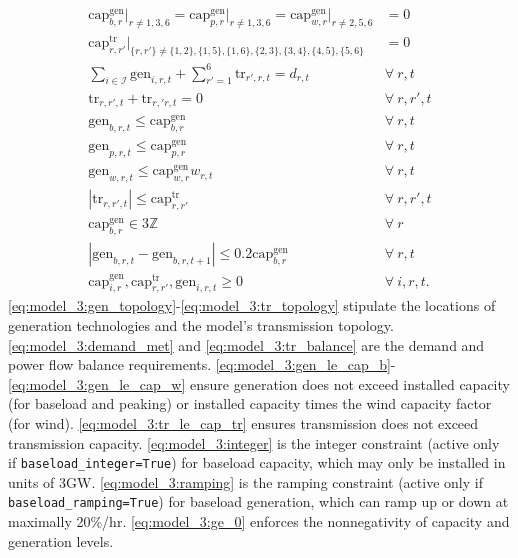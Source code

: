 \documentclass[preprint]{elsarticle}
\begin{document}
\begin{align}
\text{cap}_{b,r}^\text{gen} \big\rvert_{r \ne 1, 3, 6} = \text{cap}_{p,r}^\text{gen} \big\rvert_{r \ne 1, 3, 6} = \text{cap}_{w,r}^\text{gen} \big\rvert_{r \ne 2, 5, 6} &= 0 \label{eq:model_3:gen_topology} \\
\text{cap}_{r, r'}^\text{tr} \big\rvert_{\{r, r'\} \ne \{1,2\}, \{1,5\}, \{1,6\}, \{2,3\}, \{3,4\}, \{4,5\}, \{5,6\}} &= 0 \label{eq:model_3:tr_topology} \\
\sum_{i \in \mathcal{I}} \text{gen}_{i,r,t} + \sum_{r'=1}^6 \text{tr}_{r',r,t} = d_{r,t} \quad & \forall \: r, t \label{eq:model_3:demand_met} \\
\text{tr}_{r,r',t} + \text{tr}_{r,'r,t} = 0 \quad & \forall \: r, r', t \label{eq:model_3:tr_balance} \\
\text{gen}_{b,r,t} \le \text{cap}_{b,r}^\text{gen} \quad & \forall \: r, t \label{eq:model_3:gen_le_cap_b} \\
\text{gen}_{p,r,t} \le \text{cap}_{p,r}^\text{gen} \quad & \forall \: r, t \label{eq:model_3:gen_le_cap_p} \\
\text{gen}_{w,r,t} \le \text{cap}_{w,r}^\text{gen} w_{r,t} \quad & \forall \: r, t \label{eq:model_3:gen_le_cap_w} \\
|\text{tr}_{r,r',t}| \le \text{cap}_{r,r'}^\text{tr} \quad & \forall \: r, r', t \label{eq:model_3:tr_le_cap_tr} \\
\text{cap}_{b,r}^\text{gen} \in 3\mathbb{Z} \quad & \forall \: r \label{eq:model_3:integer} \\
|\text{gen}_{b,r,t} - \text{gen}_{b,r,t+1}| \le 0.2 \text{cap}_{b,r}^\text{gen} \quad & \forall \: r, t \label{eq:model_3:ramping} \\
\text{cap}_{i,r}^\text{gen}, \text{cap}_{r,r'}^\text{tr}, \text{gen}_{i,r,t} \ge 0 \quad & \forall \: i, r, t. \label{eq:model_3:ge_0}
\end{align}
\noindent \eqref{eq:model_3:gen_topology}-\eqref{eq:model_3:tr_topology} stipulate the locations of generation technologies and the model's transmission topology. \eqref{eq:model_3:demand_met} and \eqref{eq:model_3:tr_balance} are the demand and power flow balance requirements. \eqref{eq:model_3:gen_le_cap_b}-\eqref{eq:model_3:gen_le_cap_w} ensure generation does not exceed installed capacity (for baseload and peaking) or installed capacity times the wind capacity factor (for wind). \eqref{eq:model_3:tr_le_cap_tr} ensures transmission does not exceed transmission capacity. \eqref{eq:model_3:integer} is the integer constraint (active only if \texttt{baseload\_integer=True}) for baseload capacity, which may only be installed in units of 3GW. \eqref{eq:model_3:ramping} is the ramping constraint (active only if \texttt{baseload\_ramping=True}) for baseload generation, which can ramp up or down at maximally 20\%/hr. \eqref{eq:model_3:ge_0} enforces the nonnegativity of capacity and generation levels.
\end{document}
